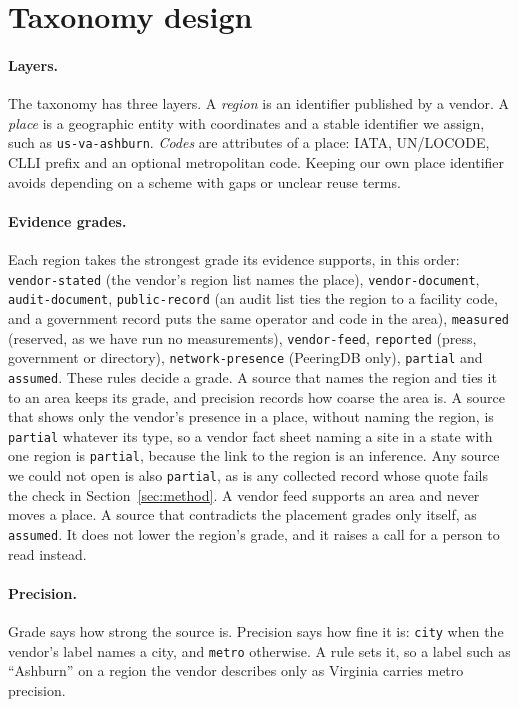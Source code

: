 \documentclass[10pt,twocolumn]{article}
\newcommand{\code}[1]{\texttt{#1}}
\begin{document}
\section{Taxonomy design}
\label{sec:design}

\paragraph{Layers.} The taxonomy has three layers. A \emph{region} is an identifier published by a vendor. A \emph{place} is a geographic entity with coordinates and a stable identifier we assign, such as \code{us-va-ashburn}. \emph{Codes} are attributes of a place: IATA, UN/LOCODE, CLLI prefix and an optional metropolitan code. Keeping our own place identifier avoids depending on a scheme with gaps or unclear reuse terms.

\paragraph{Evidence grades.} Each region takes the strongest grade its evidence supports, in this order: \code{vendor-stated} (the vendor's region list names the place), \code{vendor-document}, \code{audit-document}, \code{public-record} (an audit list ties the region to a facility code, and a government record puts the same operator and code in the area), \code{measured} (reserved, as we have run no measurements), \code{vendor-feed}, \code{reported} (press, government or directory), \code{network-presence} (PeeringDB only), \code{partial} and \code{assumed}. These rules decide a grade. A source that names the region and ties it to an area keeps its grade, and precision records how coarse the area is. A source that shows only the vendor's presence in a place, without naming the region, is \code{partial} whatever its type, so a vendor fact sheet naming a site in a state with one region is \code{partial}, because the link to the region is an inference. Any source we could not open is also \code{partial}, as is any collected record whose quote fails the check in Section~\ref{sec:method}. A vendor feed supports an area and never moves a place. A source that contradicts the placement grades only itself, as \code{assumed}. It does not lower the region's grade, and it raises a call for a person to read instead.

\paragraph{Precision.} Grade says how strong the source is. Precision says how fine it is: \code{city} when the vendor's label names a city, and \code{metro} otherwise. A rule sets it, so a label such as ``Ashburn'' on a region the vendor describes only as Virginia carries metro precision.
\end{document}
